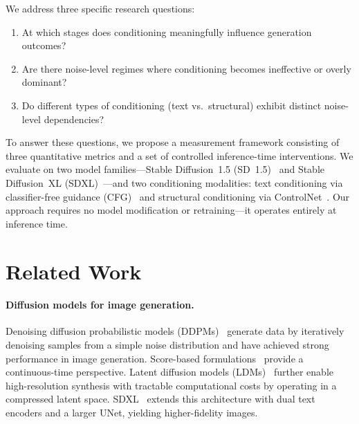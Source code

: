 \documentclass{article}
\begin{document}
We address three specific research questions:
\begin{enumerate}[nosep, leftmargin=*]
    \item At which stages does conditioning meaningfully influence generation outcomes?
    \item Are there noise-level regimes where conditioning becomes ineffective or overly dominant?
    \item Do different types of conditioning (text vs.\ structural) exhibit distinct noise-level dependencies?
\end{enumerate}

To answer these questions, we propose a measurement framework consisting of three quantitative metrics and a set of controlled inference-time interventions. We evaluate on two model families---Stable Diffusion~1.5 (SD~1.5)~\citep{rombach2022high} and Stable Diffusion~XL (SDXL)~\citep{podell2023sdxl}---and two conditioning modalities: text conditioning via classifier-free guidance (CFG)~\citep{ho2022classifier} and structural conditioning via ControlNet~\citep{zhang2023adding}. Our approach requires no model modification or retraining---it operates entirely at inference time.

\section{Related Work}
\label{sec:related}

\paragraph{Diffusion models for image generation.}
Denoising diffusion probabilistic models (DDPMs)~\citep{ho2020denoising} generate data by iteratively denoising samples from a simple noise distribution and have achieved strong performance in image generation. Score-based formulations~\citep{song2021scorebased} provide a continuous-time perspective. Latent diffusion models (LDMs)~\citep{rombach2022high} further enable high-resolution synthesis with tractable computational costs by operating in a compressed latent space. SDXL~\citep{podell2023sdxl} extends this architecture with dual text encoders and a larger UNet, yielding higher-fidelity images.
\end{document}

